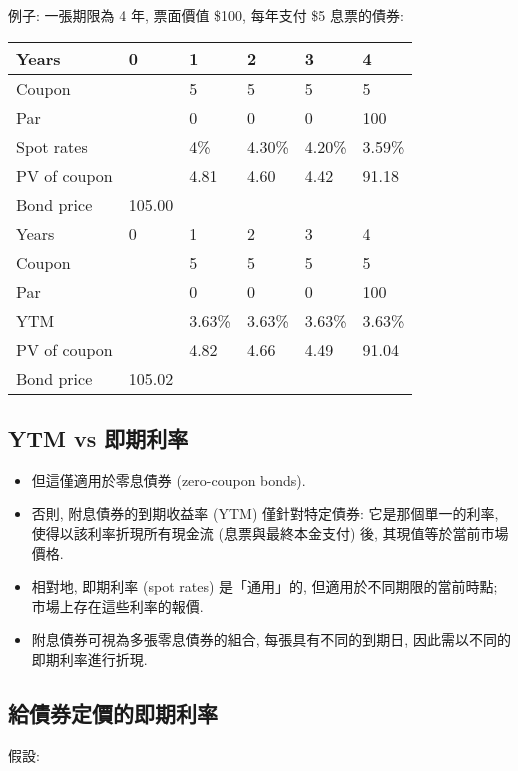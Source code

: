 \documentclass[letterpaper]{article}
\begin{document}
		
		例子: 一張期限為 4 年, 票面價值 \$100, 每年支付 \$5 息票的債券: 
		
		
		\begin{center}
			\begin{tabular}{|l|l|l|l|l|l|}
				\hline
				Years & 0 & 1 & 2 & 3 & 4 \\
				\hline
				Coupon &  & 5 & 5 & 5 & 5 \\
				\hline
				Par &  & 0 & 0 & 0 & 100 \\
				\hline
				Spot rates &  & 4\% & 4.30\% & 4.20\% & 3.59\% \\
				\hline
				PV of coupon &  & 4.81 & 4.60 & 4.42 & 91.18 \\
				\hline
				Bond price & 105.00 &  &  &  &  \\
				\hline
				Years & 0 & 1 & 2 & 3 & 4 \\
				\hline
				Coupon &  & 5 & 5 & 5 & 5 \\
				\hline
				Par &  & 0 & 0 & 0 & 100 \\
				\hline
				YTM &  & 3.63\% & 3.63\% & 3.63\% & 3.63\% \\
				\hline
				PV of coupon &  & 4.82 & 4.66 & 4.49 & 91.04 \\
				\hline
				Bond price & 105.02 &  &  &  &  \\
				\hline
			\end{tabular}
		\end{center}
		
		\subsection{YTM vs 即期利率}
		\begin{itemize}
			\item 但這僅適用於零息債券 (zero-coupon bonds).  
			\item 否則, 附息債券的到期收益率 (YTM) 僅針對特定債券: 它是那個單一的利率, 使得以該利率折現所有現金流 (息票與最終本金支付) 後, 其現值等於當前市場價格.  
			\item 相對地, 即期利率 (spot rates) 是「通用」的, 但適用於不同期限的當前時點; 市場上存在這些利率的報價.  
			\item 附息債券可視為多張零息債券的組合, 每張具有不同的到期日, 因此需以不同的即期利率進行折現.  
		\end{itemize}
		
		\subsection{給債券定價的即期利率}
		假設: 
		
\end{document}
